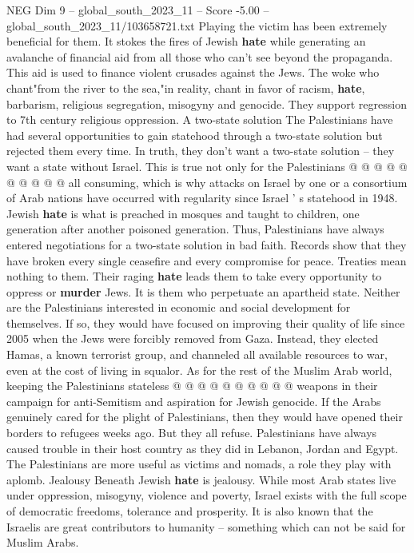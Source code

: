 \begin{textsample}{NEG Dim 9 – global\_south\_2023\_11 – Score -5.00 – global\_south\_2023\_11/103658721.txt}
Playing the victim has been extremely beneficial for them.
It stokes the fires of Jewish \textbf{hate} while generating an avalanche of financial aid from all those who can't see beyond the propaganda.
This aid is used to finance violent crusades against the Jews.
The woke who chant"from the river to the sea,"in reality, chant in favor of racism, \textbf{hate}, barbarism, religious segregation, misogyny and genocide.
They support regression to 7th century religious oppression.
A two-state solution The Palestinians have had several opportunities to gain statehood through a two-state solution but rejected them every time.
In truth, they don't want a two-state solution -- they want a state without Israel.
This is true not only for the Palestinians @ @ @ @ @ @ @ @ @ @ all consuming, which is why attacks on Israel by one or a consortium of Arab nations have occurred with regularity since Israel ' s statehood in 1948.
Jewish \textbf{hate} is what is preached in mosques and taught to children, one generation after another poisoned generation.
Thus, Palestinians have always entered negotiations for a two-state solution in bad faith.
Records show that they have broken every single ceasefire and every compromise for peace.
Treaties mean nothing to them.
Their raging \textbf{hate} leads them to take every opportunity to oppress or \textbf{murder} Jews.
It is them who perpetuate an apartheid state.
Neither are the Palestinians interested in economic and social development for themselves.
If so, they would have focused on improving their quality of life since 2005 when the Jews were forcibly removed from Gaza.
Instead, they elected Hamas, a known terrorist group, and channeled all available resources to war, even at the cost of living in squalor.
As for the rest of the Muslim Arab world, keeping the Palestinians stateless @ @ @ @ @ @ @ @ @ @ weapons in their campaign for anti-Semitism and aspiration for Jewish genocide.
If the Arabs genuinely cared for the plight of Palestinians, then they would have opened their borders to refugees weeks ago.
But they all refuse.
Palestinians have always caused trouble in their host country as they did in Lebanon, Jordan and Egypt.
The Palestinians are more useful as victims and nomads, a role they play with aplomb.
Jealousy Beneath Jewish \textbf{hate} is jealousy.
While most Arab states live under oppression, misogyny, violence and poverty, Israel exists with the full scope of democratic freedoms, tolerance and prosperity.
It is also known that the Israelis are great contributors to humanity -- something which can not be said for Muslim Arabs.

\end{textsample}
